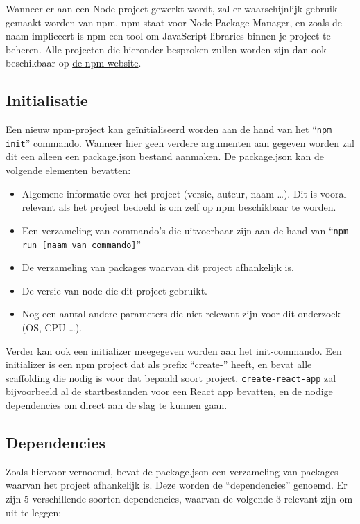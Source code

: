 Wanneer er aan een Node project gewerkt wordt, zal er waarschijnlijk gebruik gemaakt worden van npm. npm staat voor Node Package Manager, en zoals de naam impliceert is npm een tool om JavaScript-libraries binnen je project te beheren. Alle projecten die hieronder besproken zullen worden zijn dan ook beschikbaar op \href{https://www.npmjs.com/}{de npm-website}.

\subsection{Initialisatie}

Een nieuw npm-project kan geïnitialiseerd worden aan de hand van het ``\lstinline{npm init}'' commando. Wanneer hier geen verdere argumenten aan gegeven worden zal dit een alleen een package.json bestand aanmaken. De package.json kan de volgende elementen bevatten: \autocite{npmDocsPackageJson}

\begin{itemize}
    \item Algemene informatie over het project (versie, auteur, naam \ldots). Dit is vooral relevant als het project bedoeld is om zelf op npm beschikbaar te worden.
    \item Een verzameling van commando's die uitvoerbaar zijn aan de hand van ``\lstinline{npm run [naam van commando]}''
    \item De verzameling van packages waarvan dit project afhankelijk is.
    \item De versie van node die dit project gebruikt.
    \item Nog een aantal andere parameters die niet relevant zijn voor dit onderzoek (OS, CPU \ldots).
\end{itemize}

Verder kan ook een initializer meegegeven worden aan het init-commando. Een initializer is een npm project dat als prefix ``create-'' heeft, en bevat alle scaffolding die nodig is voor dat bepaald soort project. \lstinline{create-react-app} zal bijvoorbeeld al de startbestanden voor een React app bevatten, en de nodige dependencies om direct aan de slag te kunnen gaan.

\subsection{Dependencies}

Zoals hiervoor vernoemd, bevat de package.json een verzameling van packages waarvan het project afhankelijk is. Deze worden de ``dependencies'' genoemd. Er zijn 5 verschillende soorten dependencies, waarvan de volgende 3 relevant zijn om uit te leggen:

